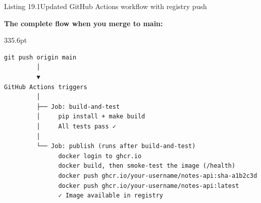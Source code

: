 \begin{codeboxcap}{\textcolor{accent}{Listing 19.1}\enspace Updated GitHub Actions workflow with registry push}
\begin{Shaded}
\begin{Highlighting}[]
\AttributeTok{      }\KeywordTok{{-}}\AttributeTok{ }\KeywordTok{:}
\AttributeTok{        }\KeywordTok{:}
\AttributeTok{        }\KeywordTok{:}
\AttributeTok{          }\KeywordTok{:}
\AttributeTok{          }\KeywordTok{:}
\AttributeTok{          }\KeywordTok{:}

\AttributeTok{      }\KeywordTok{{-}}\AttributeTok{ }\KeywordTok{:}
\AttributeTok{        }\KeywordTok{:}
\AttributeTok{        }\KeywordTok{:}
\AttributeTok{          }\KeywordTok{:}
\AttributeTok{          }\KeywordTok{:}\AttributeTok{ }
\AttributeTok{          }\KeywordTok{:}
\AttributeTok{          }\KeywordTok{:}
\AttributeTok{          }\KeywordTok{:}
\end{Highlighting}
\end{Shaded}

\end{codeboxcap}

\noindent{}\textbf{The complete flow when you merge to main:}

\begin{diagrambox}[short]{335.6pt}
\begin{Verbatim}[fontsize=\fontsize{9.0}{8.55}\selectfont]
git push origin main
         │
         ▼
GitHub Actions triggers
         │
         ├── Job: build-and-test
         │     pip install + make build
         │     All tests pass ✓
         │
         └── Job: publish (runs after build-and-test)
               docker login to ghcr.io
               docker build, then smoke-test the image (/health)
               docker push ghcr.io/your-username/notes-api:sha-a1b2c3d
               docker push ghcr.io/your-username/notes-api:latest
               ✓ Image available in registry
\end{Verbatim}
\end{diagrambox}

